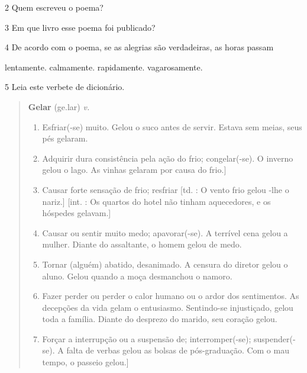 
\num{2} Quem escreveu o poema?


\num{3} Em que livro esse poema foi publicado?


\num{4} De acordo com o poema, se as alegrias são verdadeiras, as horas passam

\begin{boxlist}
   lentamente.
   calmamente.
   rapidamente.
   vagarosamente.
\end{boxlist}

\num{5} Leia este verbete de dicionário.

\begin{quote}
\textbf{Gelar} (ge.lar)
\textit{v.}

\begin{enumerate}
\item Esfriar(-se) muito.
Gelou o suco antes de servir.
Estava sem meias, seus pés gelaram.

\item Adquirir dura consistência pela ação do frio; congelar(-se).
O inverno gelou o lago.
As vinhas gelaram por causa do frio.]

\item Causar forte sensação de frio; resfriar [td. : O vento frio gelou -lhe o nariz.] [int. : Os quartos do hotel não tinham aquecedores, e os hóspedes gelavam.]

\item Causar ou sentir muito medo; apavorar(-se).
A terrível cena gelou a mulher.
Diante do assaltante, o homem gelou de medo.

\item Tornar (alguém) abatido, desanimado.
A censura do diretor gelou o aluno.
Gelou quando a moça desmanchou o namoro.

\item Fazer perder ou perder o calor humano ou o ardor dos sentimentos.
As decepções da vida gelam o entusiasmo.
Sentindo-se injustiçado, gelou toda a família.
Diante do desprezo do marido, seu coração gelou.

\item Forçar a interrupção ou a suspensão de; interromper(-se); suspender(-se).
A falta de verbas gelou as bolsas de pós-graduação.
Com o mau tempo, o passeio gelou.]
\end{enumerate}

\end{quote}

